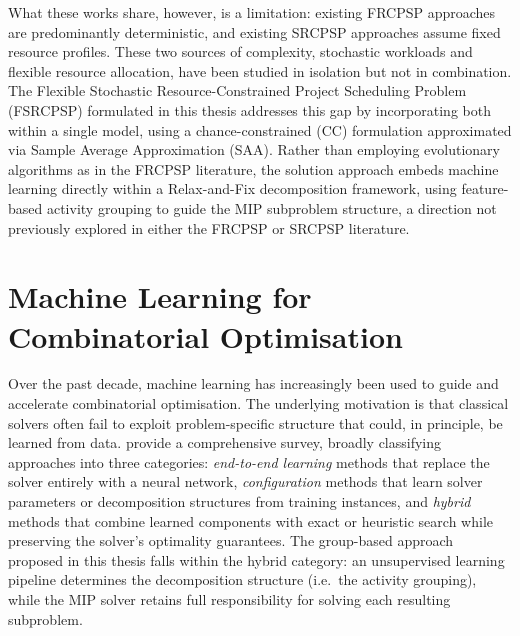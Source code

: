 What these works share, however, is a limitation: existing FRCPSP
approaches are predominantly deterministic, and existing SRCPSP approaches assume fixed
resource profiles. These two sources of complexity, stochastic workloads and flexible
resource allocation, have been studied in isolation but not in combination. The
Flexible Stochastic Resource-Constrained Project Scheduling Problem (FSRCPSP)
formulated in this thesis addresses this gap by incorporating both within a single
model, using a chance-constrained (CC) formulation approximated
via Sample Average Approximation (SAA). Rather than employing evolutionary algorithms as in the FRCPSP
literature, the solution approach embeds machine learning directly within a
Relax-and-Fix decomposition framework, using feature-based activity grouping to guide
the MIP subproblem structure, a direction not previously explored in either the FRCPSP
or SRCPSP literature.

\section{Machine Learning for Combinatorial Optimisation}
\label{sec:ml_co}
Over the past decade, machine learning has increasingly been used to guide and accelerate combinatorial optimisation. The underlying motivation is that classical solvers often fail to exploit problem-specific structure that could, in principle, be
learned from data. \cite{Bengio2021} provide a comprehensive survey, broadly
classifying approaches into three categories: \textit{end-to-end learning} methods that
replace the solver entirely with a neural network, \textit{configuration} methods that
learn solver parameters or decomposition structures from training instances, and
\textit{hybrid} methods that combine learned components with exact or heuristic search
while preserving the solver's optimality guarantees. The group-based approach proposed
in this thesis falls within the hybrid category: an unsupervised learning pipeline
determines the decomposition structure (i.e.\ the activity grouping), while the MIP solver
retains full responsibility for solving each resulting subproblem.

